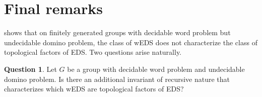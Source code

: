 \documentclass{article}
\newtheorem{theorem}{Theorem}[section]
\theoremstyle{definition}
\newtheorem{remark}[theorem]{Remark}
\newtheorem{question}[theorem]{Question}
\theoremstyle{plain}
\begin{document}
        
  
        

    
\section{Final remarks}\label{sec:conclusion}



 shows that on finitely generated groups with decidable word problem but undecidable domino problem, the class of wEDS does not characterize the class of topological factors of EDS. Two questions arise naturally.

\begin{question}
    Let $G$ be a group with decidable word problem and undecidable domino problem. Is there an additional invariant of recursive nature that characterizes which wEDS are topological factors of EDS?
\end{question}
\end{document}
